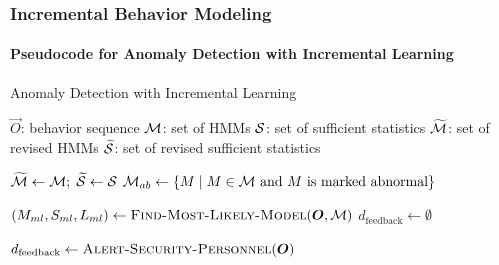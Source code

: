 
\begin{frame}
    \frametitle{Incremental Behavior Modeling}
    \framesubtitle{Pseudocode for Anomaly Detection with 
        Incremental Learning}

    \begin{algorithm}[H]
        \caption{Anomaly Detection with Incremental Learning}
        \label{anomaly-detection-with-iml-algorithm}
        \begin{algorithmic}
            \REQUIRE $\vec{O}$: behavior sequence 
            \REQUIRE ${\cal M}$: set of HMMs 
            \REQUIRE ${\cal S}$: set of sufficient statistics 
            \ENSURE $\widetilde{\cal M}$: set of revised HMMs 
            \ENSURE $\widetilde{\cal S}$: set of revised sufficient statistics

            \STATE $\widetilde{\cal M} \gets {\cal M}; \; \widetilde{\cal S} \gets {\cal S}$
            \STATE ${\cal M}_{ab} \gets \{ M \mid M \in {\cal M} \text{~and $M$ is marked abnormal} \}$ 

            \STATE $( M_{ml}, S_{ml}, L_{ml} ) \gets
                \textsc{Find-Most-Likely-Model}(\vec{O}, {\cal M})$ 
            \STATE $d_{\text{feedback}} \gets \emptyset$

                \STATE $d_{\text{feedback}} \gets \textsc{Alert-Security-Personnel}(\vec{O})$
            \ENDIF


        \end{algorithmic}
    \end{algorithm}

\end{frame}


